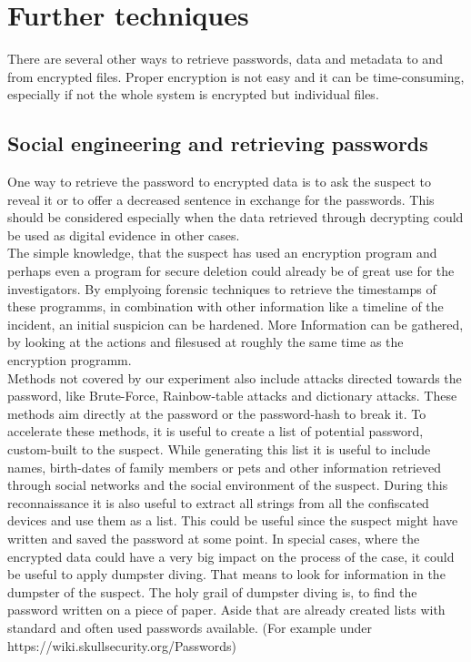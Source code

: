 \section{Further techniques}
There are several other ways to retrieve passwords, data and metadata to
and from encrypted files. Proper encryption is not easy and it can be 
time-consuming, especially if not the whole system is encrypted but 
individual files.\\
\subsection{Social engineering and retrieving passwords}
One way to retrieve the password to encrypted data is to ask the suspect
to reveal it or to offer a decreased sentence in exchange for the passwords.
This should be considered especially when the data retrieved through decrypting could be used as digital 
evidence in other cases.\\
The simple knowledge, that the suspect has used an encryption program and
perhaps even a program for secure deletion could already be of great use for the
investigators. By emplyoing forensic techniques to retrieve the timestamps 
of these programms, in combination with other information like a timeline
of the incident, an initial suspicion can be hardened. More Information can be
gathered, by looking at the actions and filesused at roughly the same time as the encryption programm.\\
Methods not covered by our experiment also include attacks directed towards 
the password, like Brute-Force, Rainbow-table attacks and dictionary attacks.
These methods aim directly at the password or the password-hash to break it.
To accelerate these methods, it is useful to create a list of potential
password, custom-built to the suspect. While generating this list it is useful 
to include names, birth-dates of family members or pets and
other information retrieved through social networks and the social 
environment of the suspect.
During this reconnaissance it is also useful to extract all strings from all
the confiscated devices and use them as a list. This could be useful since
the suspect might have written and saved the password at some point.
In special cases, where the encrypted data could have a very big impact on the
process of the case, it could be useful to apply dumpster diving. 
That means to look for information in the dumpster of the suspect.
The holy grail of dumpster diving is, to find the password written on a piece
of paper.
Aside that are already created lists with standard and often used passwords
available.
(For example under https://wiki.skullsecurity.org/Passwords)

